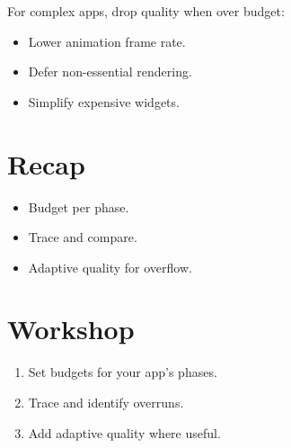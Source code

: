 For complex apps, drop quality when over budget:

\begin{itemize}[leftmargin=*]
  \item Lower animation frame rate.
  \item Defer non-essential rendering.
  \item Simplify expensive widgets.
\end{itemize}

\section{Recap}

\begin{recap}
\begin{itemize}[leftmargin=*]
  \item Budget per phase.
  \item Trace and compare.
  \item Adaptive quality for overflow.
\end{itemize}
\end{recap}

\section*{Workshop}

\begin{enumerate}[leftmargin=*]
  \item Set budgets for your app's phases.
  \item Trace and identify overruns.
  \item Add adaptive quality where useful.
\end{enumerate}
